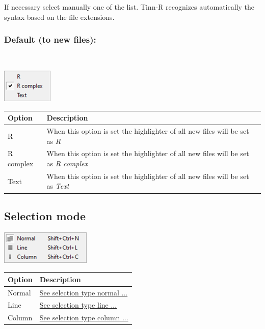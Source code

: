 If necessary select manually one of the list. Tinn-R recognizes
automatically the syntax based on the file extensions.


\hypertarget{menu_options_syntax_default}{}
\subsubsection{Default (to new files):}\\

\includegraphics[scale=0.8]{./res/menu_options_syntax_default.png}\\

\begin{scriptsize}
  \begin{tabularx}{\textwidth}{>{\hsize=0.2\hsize}X>{\hsize=0.8\hsize}X}\\
    \hline
    \textbf{Option} & \textbf{Description} \\
    \hline
    R & When this option is set the highlighter of all new files will be set as \textit{R} \\
    R complex & When this option is set the highlighter of all new files will be set as \textit{R complex} \\
    Text & When this option is set the highlighter of all new files will be set as \textit{Text} \\
    \hline
  \end{tabularx}
\end{scriptsize}


\hypertarget{menu_options_selectionmode}{}
\subsection{Selection mode}

\includegraphics[scale=0.8]{./res/menu_options_selectionmode.png}\\

\begin{scriptsize}
  \begin{tabularx}{\textwidth}{>{\hsize=0.3\hsize}X>{\hsize=0.7\hsize}X}\\
    \hline
    \textbf{Option} & \textbf{Description} \\
    \hline
    Normal & \href{\#working\_selectionmode\_normal}{See selection type normal ...} \\
    Line & \href{\#working\_selectionmode\_line}{See selection type line ...} \\
    Column & \href{\#working\_selectionmode\_column}{See selection type column ...} \\
    \hline
  \end{tabularx}
\end{scriptsize}
